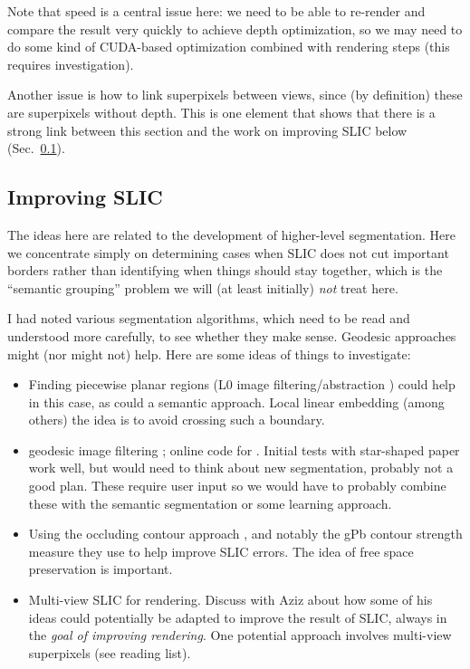 \documentclass{article}
\begin{document}
Note that speed is a central issue here: we need to be able to re-render and
compare the result very quickly to achieve depth optimization, 
so we may need to do some kind of
CUDA-based optimization combined with rendering steps (this requires
investigation).

Another issue is how to link superpixels between views, since (by definition) these are
superpixels without depth. This is one element that shows that there is a strong
link between this section and the work on improving SLIC below (Sec.~\ref{sec:imslic}).


\subsection{Improving SLIC}
\label{sec:imslic}
The ideas here are related to the development of higher-level segmentation.
Here we concentrate simply on determining cases when SLIC does not cut important
borders rather than identifying when things should stay together, 
which is the ``semantic grouping'' problem we will (at least initially) \emph{not} treat here.

I had noted various segmentation algorithms, which need to be read and understood more
carefully, to see whether they make sense. Geodesic approaches might (nor might not) help. Here are some ideas of things to investigate:
\begin{itemize}
\item Finding piecewise planar regions (L0 image filtering/abstraction \cite{xu2011image}) could help in this case, as could a semantic approach. Local linear embedding \cite{chen2012manifold} (among others) the idea is to avoid crossing such a boundary.
\item geodesic image filtering \cite{criminisi2010geodesic}; online code for \cite{gulshan2010geodesic}. Initial tests with star-shaped paper \cite{gulshan2010geodesic} work well, but would need to think about new segmentation, probably not a good plan. These require user input so we would have to probably combine these with the semantic segmentation or some learning approach.
\item Using the occluding contour approach \cite{shan2014occluding}, and notably the gPb contour strength measure they use to help improve SLIC errors. The idea of free space preservation is important.
\item Multi-view SLIC for rendering. Discuss with Aziz about how some
of his ideas could potentially be adapted to improve the result of SLIC, always
in the \emph{goal of improving rendering}.
One potential approach involves multi-view superpixels (see reading list).
\end{itemize}
\end{document}
